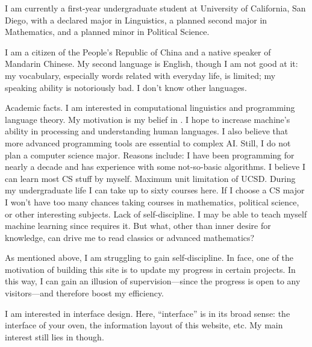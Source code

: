 I am currently a first-year undergraduate student at University of California,
San Diego, with a declared major in Linguistics, a planned second major in
Mathematics, and a planned minor in Political Science.

I am a citizen of the People’s Republic of China and a native speaker of
Mandarin Chinese. My second language is English, though I am not good at it:
my vocabulary, especially words related with everyday life, is limited; my
speaking ability is notoriously bad. I don’t know other languages.

Academic facts. I am interested in computational linguistics and programming
language theory. My motivation is my belief in . I hope to
increase machine’s ability in processing and understanding human languages.
I also believe that more advanced programming tools are essential to complex
AI. Still, I do not plan a computer science major. Reasons include:
\@ulist
  \@item I have been programming for nearly a decade and has experience with
    some not-so-basic algorithms. I believe I can learn most CS stuff by myself.
  \@item Maximum unit limitation of UCSD. During my undergraduate life I can
    take up to sixty courses here. If I choose a CS major I won’t have too many
    chances taking courses in mathematics, political science, or other
    interesting subjects.
  \@item Lack of self-discipline. I may be able to teach myself machine learning
    since  requires it. But what, other than inner desire for
    knowledge, can drive me to read classics or advanced mathematics?


As mentioned above, I am struggling to gain self-discipline. In face, one of the
motivation of building this site is to update my progress in certain projects.
In this way, I can gain an illusion of supervision—since the progress is open to
any visitors—and therefore boost my efficiency.

I am interested in interface design. Here, “interface” is in its broad sense:
the interface of your oven, the information layout of this website, etc. My main
interest still lies in  though.


